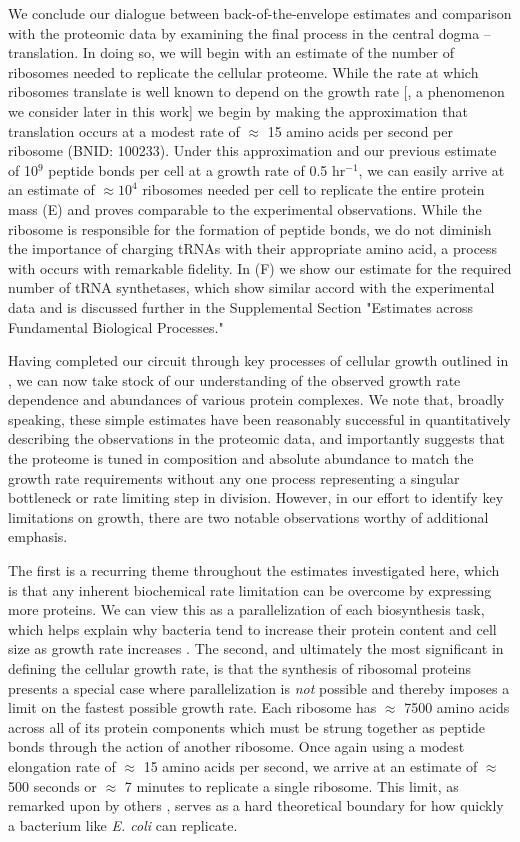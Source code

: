 We conclude our dialogue between back-of-the-envelope estimates and comparison
with the proteomic data by examining the final process in the central dogma --
translation. In doing so, we will begin with an estimate of the number of
ribosomes needed to replicate the cellular proteome. While the rate at which
ribosomes translate is well known to depend on the growth rate [\cite{dai2018},
a phenomenon we consider later in this work] we begin by making the
approximation that translation occurs at a modest rate of $\approx$ 15 amino
acids per second per ribosome (BNID: 100233). Under this approximation and our
previous estimate of 10$^{9}$ peptide bonds per cell at a growth rate of 0.5
hr$^{-1}$, we can easily arrive at an estimate of $\approx 10^4$ ribosomes
needed per cell to replicate the entire protein mass (E) and
proves comparable to the experimental observations. While the ribosome is
responsible for the formation of peptide bonds, we do not diminish the
importance of charging tRNAs with their appropriate amino acid, a process with
occurs with remarkable fidelity. In (F) we show our estimate
for the required number of tRNA synthetases, which show similar accord with the
experimental data and is discussed further in the Supplemental Section "Estimates across
Fundamental Biological Processes."

Having completed our circuit through key processes of cellular growth outlined
in , we can now take stock of our understanding of the observed
growth rate dependence and abundances of various protein complexes. We note
that, broadly speaking, these simple estimates have been reasonably successful
in quantitatively describing the observations in the proteomic data, and
importantly suggests that the proteome is tuned in composition and absolute
abundance to match the growth rate requirements without any one process
representing a singular bottleneck or rate limiting step in division. However,
in our effort to identify key limitations on growth, there are two notable
observations worthy of additional emphasis.

The first is a recurring theme throughout the estimates investigated here, which
is that any inherent biochemical rate limitation can be overcome by expressing
more proteins. We can view this as a parallelization of each biosynthesis task,
which helps explain why bacteria tend to increase their protein content and
cell size as growth rate increases \citep{ojkic2019}. The second, and
ultimately the most significant in defining the cellular growth rate, is that
the synthesis of ribosomal proteins presents a special case where
parallelization is \textit{not} possible and thereby imposes a limit on the
fastest possible growth rate. Each ribosome has $\approx$ 7500 amino acids
across all of its protein components which must be strung together as peptide
bonds through the action of another ribosome. Once again using a modest
elongation rate of $\approx$ 15 amino acids per second, we arrive at an estimate of
$\approx$ 500 seconds or $\approx$ 7 minutes to replicate a single ribosome.
This limit, as remarked upon by others \citep{dill2011}, serves as a hard
theoretical boundary for how quickly a bacterium like \textit{E. coli} can
replicate.

